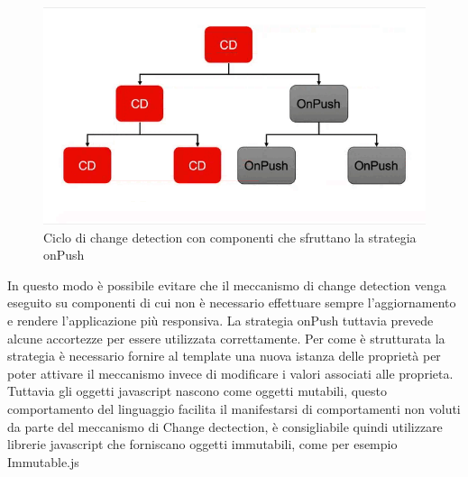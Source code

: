 \begin{figure}[H]
    \centering
 \includegraphics[scale=0.75]{resources/cd-onPush.png}
   \caption{Ciclo di change detection con componenti che sfruttano la strategia onPush}
\end{figure}
In questo modo è possibile evitare che il meccanismo di change detection venga eseguito su componenti di cui non è necessario effettuare sempre l'aggiornamento e rendere l'applicazione più responsiva.
\newline
La strategia onPush tuttavia prevede alcune accortezze per essere utilizzata correttamente. Per come è strutturata la strategia è necessario fornire al template una nuova istanza delle proprietà per poter attivare il meccanismo invece di modificare i valori associati alle proprieta.
\newline
Tuttavia gli oggetti javascript nascono come oggetti mutabili, questo comportamento del linguaggio facilita il manifestarsi di comportamenti non voluti da parte del meccanismo di Change dectection, è consigliabile quindi utilizzare librerie javascript che forniscano oggetti immutabili, come per esempio Immutable.js
